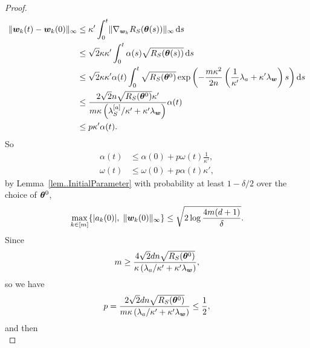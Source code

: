 \documentclass{article}
\begin{document}
\begin{proof}
    \begin{equation}
        \begin{aligned}
            \lVert\bm{w}_k(t) - \bm{w}_k(0)\rVert_{\infty}
             & \leq \kappa'\int_{0}^{t} \lVert\nabla_{\bm{w}_k}R_S(\bm{\theta}(s))\rVert_{\infty}\mathop{}\!\mathrm{d}{s}                                                                                                     \\
             & \leq \sqrt{2}\kappa\kappa' \int_{0}^t \alpha(s)\sqrt{R_S(\bm{\theta}(s))} \mathop{}\!\mathrm{d}{s}                                                                                                     \\
             & \leq \sqrt{2}\kappa\kappa' \alpha(t) \int_{0}^{t} \sqrt{R_S(\bm{\theta}^0)}\exp\left(-\frac{m\kappa^2}{2n}\left(\frac{1}{\kappa'}\lambda_a+\kappa'\lambda_{\bm{w}}\right)s\right)\mathop{}\!\mathrm{d}{s} \\
             & \leq \frac{2\sqrt{2}n\sqrt{R_S(\bm{\theta}^0)}\kappa'}{m\kappa\left(\lambda^{[a]}_S/\kappa'+\kappa'\lambda_{\bm{w}}\right)}\alpha(t)                                                      \\
             & \leq p\kappa'\alpha(t).
        \end{aligned}
    \end{equation}
    So
    \begin{equation}
        \begin{aligned}
            \alpha(t) & \leq\alpha(0)+p\omega(t)\frac{1}{\kappa'}, \\
            \omega(t) & \leq\omega(0)+p\alpha(t)\kappa',
        \end{aligned}
    \end{equation}
    by Lemma~\ref{lem..InitialParameter} with probability at least $1 - \delta/2$ over the choice of $\bm{\theta}^0$,
    \begin{equation}
        \max\limits_{k\in[m]}\{\lvert a_k(0)\rvert,\;\lVert\bm{w}_k(0)\rVert_{\infty}\}\leq \sqrt{2\log\frac{4m(d+1)}{\delta}}.
    \end{equation}
    Since
    \begin{equation}
        m \geq \frac{4\sqrt{2}dn\sqrt{R_S(\bm{\theta}^0)}}{\kappa\left(\lambda_a/\kappa'+\kappa'\lambda_{\bm{w}}\right)},
    \end{equation}
    so we have
    \begin{equation}
        p=\frac{2\sqrt{2}dn\sqrt{R_S(\bm{\theta}^0)}}{m\kappa\left(\lambda_a/\kappa'+\kappa'\lambda_{\bm{w}}\right)}\leq \frac{1}{2},
    \end{equation}
    and then
    \begin{equation}

\end{equation}
\end{proof}
\end{document}
